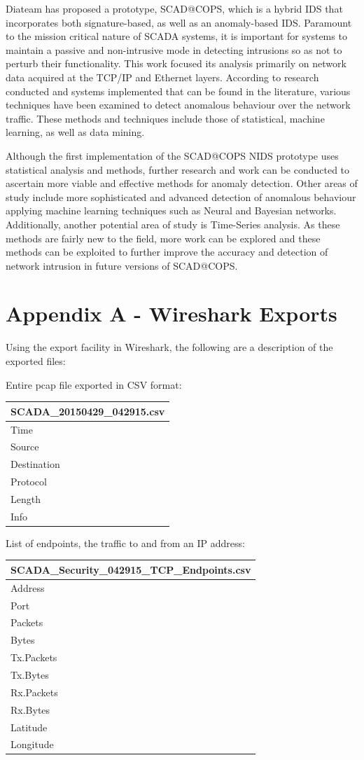 \documentclass[12pt,]{article}
\begin{document}
Diateam has proposed a prototype, SCAD@COPS, which is a hybrid IDS that
incorporates both signature-based, as well as an anomaly-based IDS.
Paramount to the mission critical nature of SCADA systems, it is
important for systems to maintain a passive and non-intrusive mode in
detecting intrusions so as not to perturb their functionality. This work
focused its analysis primarily on network data acquired at the TCP/IP
and Ethernet layers. According to research conducted and systems
implemented that can be found in the literature, various techniques have
been examined to detect anomalous behaviour over the network traffic.
These methods and techniques include those of statistical, machine
learning, as well as data mining.

Although the first implementation of the SCAD@COPS NIDS prototype uses
statistical analysis and methods, further research and work can be
conducted to ascertain more viable and effective methods for anomaly
detection. Other areas of study include more sophisticated and advanced
detection of anomalous behaviour applying machine learning techniques
such as Neural and Bayesian networks. Additionally, another potential
area of study is Time-Series analysis. As these methods are fairly new
to the field, more work can be explored and these methods can be
exploited to further improve the accuracy and detection of network
intrusion in future versions of SCAD@COPS.

\pagebreak

\section*{Appendix A - Wireshark
Exports}\label{appendix-a---wireshark-exports}

Using the export facility in Wireshark, the following are a description
of the exported files:

Entire pcap file exported in CSV format:

\begin{longtable}[c]{@{}l@{}}
\toprule
SCADA\_20150429\_042915.csv\tabularnewline
\midrule
\endhead
Time\tabularnewline
Source\tabularnewline
Destination\tabularnewline
Protocol\tabularnewline
Length\tabularnewline
Info\tabularnewline
\bottomrule
\end{longtable}

List of endpoints, the traffic to and from an IP address:

\begin{longtable}[c]{@{}l@{}}
\toprule
SCADA\_Security\_042915\_TCP\_Endpoints.csv\tabularnewline
\midrule
\endhead
Address\tabularnewline
Port\tabularnewline
Packets\tabularnewline
Bytes\tabularnewline
Tx.Packets\tabularnewline
Tx.Bytes\tabularnewline
Rx.Packets\tabularnewline
Rx.Bytes\tabularnewline
Latitude\tabularnewline
Longitude\tabularnewline
\bottomrule
\end{longtable}
\end{document}
